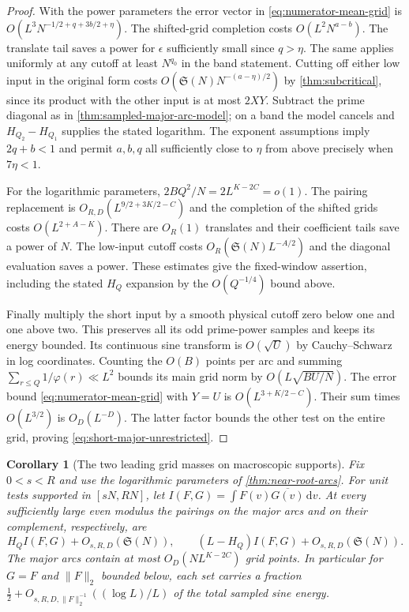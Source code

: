 \documentclass[11pt,a4paper]{article}
\numberwithin{equation}{section}
\newtheorem{corollary}[theorem]{Corollary}
\newcommand{\SSS}{\mathfrak S}
\newcommand{\ud}{\mathrm d}
\begin{document}
\begin{proof}
With the power parameters the error vector in
\eqref{eq:numerator-mean-grid} is $O(L^3
N^{-1/2+q+3b/2+\eta})$. The shifted-grid completion costs
$O(L^2N^{a-b})$. The translate tail saves a power for $\epsilon$
sufficiently small since $q>\eta$. The same applies uniformly
at any cutoff at least $N^{q_0}$ in the band statement. Cutting
off either low input in the original form costs
$O(\SSS(N)N^{-(a-\eta)/2})$ by \cref{thm:subcritical}, since
its product with the other input is at most $2XY$. Subtract
the prime diagonal as in \cref{thm:sampled-major-arc-model};
on a band the model cancels and $H_{Q_2}-H_{Q_1}$ supplies
the stated logarithm. The exponent assumptions imply
$2q+b<1$ and permit $a,b,q$ all sufficiently close to $\eta$
from above precisely when $7\eta<1$.

For the logarithmic parameters, $2BQ^2/N=2L^{K-2C}=o(1)$.
The pairing replacement is $O_{R,D}(L^{9/2+3K/2-C})$ and
the completion of the shifted grids costs $O(L^{2+A-K})$.
There are $O_R(1)$ translates and their coefficient tails save
a power of $N$. The low-input cutoff costs
$O_R(\SSS(N)L^{-A/2})$ and the diagonal evaluation saves a
power. These estimates give the fixed-window assertion, including
the stated $H_Q$ expansion by the $O(Q^{-1/4})$ bound above.

Finally multiply the short input by a smooth physical cutoff
zero below one and one above two. This preserves all its odd
prime-power samples and keeps its energy bounded. Its continuous
sine transform is $O(\sqrt U)$ by Cauchy--Schwarz in log
coordinates. Counting the $O(B)$ points per arc and summing
$\sum_{r\le Q}1/\varphi(r)\ll L^2$ bounds its main grid norm
by $O(L\sqrt{BU/N})$. The error bound
\eqref{eq:numerator-mean-grid} with $Y=U$ is
$O(L^{3+K/2-C})$. Their sum times $O(L^{3/2})$ is
$O_D(L^{-D})$. The latter factor bounds the other test on
the entire grid, proving \eqref{eq:short-major-unrestricted}.
\end{proof}

\begin{corollary}[The two leading grid masses on macroscopic supports]
\label{cor:two-grid-masses}
Fix $0<s<R$ and use the logarithmic parameters of
\cref{thm:near-root-arcs}. For unit tests supported in
$[sN,RN]$, let $I(F,G)=\int F(v)\overline{G(v)}\,\ud v$.
At every sufficiently large even modulus the pairings on the
major arcs and on their complement, respectively, are
\[
 H_Q I(F,G)+O_{s,R,D}(\SSS(N)),\qquad
 (L-H_Q) I(F,G)+O_{s,R,D}(\SSS(N)).
\]
The major arcs contain at most $O_D(NL^{K-2C})$ grid points.
In particular for $G=F$ and $\|F\|_2$ bounded below, each set
carries a fraction $\tfrac12+O_{s,R,D,\|F\|_2^{-1}}
((\log L)/L)$ of the total sampled sine energy.
\end{corollary}
\end{document}
